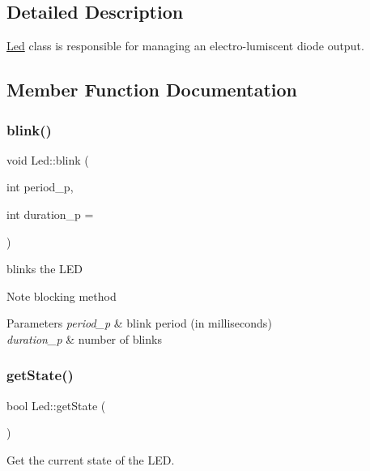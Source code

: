 \subsection{Detailed Description}
\hyperlink{class_led}{Led} class is responsible for managing an electro-\/lumiscent diode output. 

\subsection{Member Function Documentation}
\mbox{\label{class_led_a5ffc6040a68800545f1d063641cad66d}} 
\subsubsection{\texorpdfstring{blink()}{blink()}}
{\footnotesize\ttfamily void Led\+::blink (\begin{DoxyParamCaption}\item[{int}]{period\+\_\+p,  }\item[{int}]{duration\+\_\+p = {} }\end{DoxyParamCaption})}



blinks the L\+ED 

\begin{DoxyNote}{Note}
blocking method 
\end{DoxyNote}

\begin{DoxyParams}{Parameters}
{\em period\+\_\+p} & blink period (in milliseconds) \\
\hline
{\em duration\+\_\+p} & number of blinks \\
\hline
\end{DoxyParams}
\mbox{\label{class_led_a3c98242eb57df713fcb8d441d43ccd02}} 
\subsubsection{\texorpdfstring{get\+State()}{getState()}}
{\footnotesize\ttfamily bool Led\+::get\+State (\begin{DoxyParamCaption}{ }\end{DoxyParamCaption})}



Get the current state of the L\+ED. 

